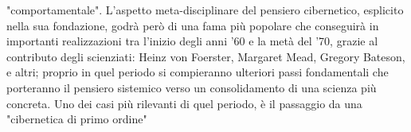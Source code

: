 
"comportamentale". 
L'aspetto meta-disciplinare del pensiero cibernetico,
esplicito nella sua fondazione, godrà però di una fama più popolare 
che conseguirà in importanti realizzazioni 
tra l'inizio degli anni '60 e la metà del '70, 
grazie al contributo degli scienziati:
Heinz von Foerster, Margaret Mead, Gregory Bateson, e altri;
proprio in quel periodo si compieranno ulteriori passi fondamentali che porteranno
il pensiero sistemico verso un consolidamento di una scienza più concreta.
Uno dei casi più rilevanti di quel periodo, è il passaggio da una "cibernetica di primo ordine"


